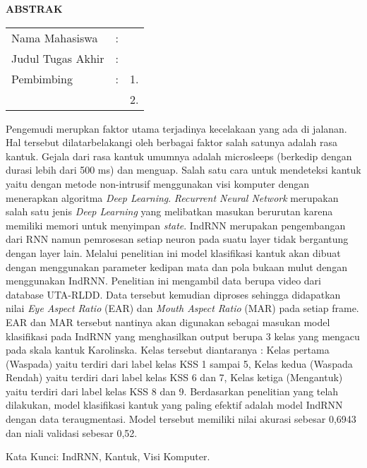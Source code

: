 \begin{center}
  \large\textbf{ABSTRAK}
\end{center}


\vspace{2ex}

\begingroup
\setlength{\tabcolsep}{0pt}

\noindent
\begin{tabularx}{\textwidth}{l >{\centering}m{2em} X}
  Nama Mahasiswa    & : & \name{}         \\

  Judul Tugas Akhir & : & \tatitle{}      \\

  Pembimbing        & : & 1. \advisor{}   \\
                    &   & 2. \coadvisor{} \\
\end{tabularx}
\endgroup

Pengemudi merupkan faktor utama terjadinya kecelakaan yang ada di jalanan. Hal tersebut
dilatarbelakangi oleh berbagai faktor salah satunya adalah rasa kantuk.  Gejala dari
rasa kantuk umumnya adalah microsleeps (berkedip dengan durasi lebih dari 500 ms) dan
menguap. Salah satu cara untuk mendeteksi kantuk yaitu dengan metode non-intrusif
menggunakan visi komputer dengan menerapkan algoritma \emph{Deep Learning}. \emph{Recurrent Neural Network} merupakan
salah satu jenis \emph{Deep Learning} yang melibatkan masukan berurutan karena memiliki memori
untuk menyimpan \emph{state}. IndRNN merupakan pengembangan dari RNN namun pemrosesan setiap
neuron pada suatu layer tidak bergantung dengan layer lain. Melalui penelitian ini
model klasifikasi kantuk akan dibuat dengan menggunakan parameter kedipan mata dan
pola bukaan mulut dengan menggunakan IndRNN. Penelitian ini mengambil data berupa
video dari database UTA-RLDD. Data tersebut kemudian diproses sehingga
didapatkan nilai \emph{Eye Aspect Ratio} (EAR) dan \emph{Mouth Aspect Ratio} (MAR) pada
setiap frame. EAR dan MAR tersebut nantinya akan digunakan sebagai masukan model
klasifikasi pada IndRNN yang menghasilkan output berupa 3 kelas yang mengacu pada skala
kantuk Karolinska. Kelas tersebut diantaranya : Kelas pertama (Waspada) yaitu
terdiri dari label kelas KSS 1 sampai 5, Kelas kedua (Waspada Rendah) yaitu terdiri dari
label kelas KSS 6 dan 7, Kelas ketiga (Mengantuk) yaitu terdiri dari label kelas
KSS 8 dan 9. Berdasarkan penelitian yang telah dilakukan, model klasifikasi kantuk yang 
paling efektif adalah model IndRNN dengan data teraugmentasi. Model tersebut memiliki 
nilai akurasi sebesar 0,6943 dan niali validasi sebesar 0,52.

Kata Kunci: IndRNN, Kantuk, Visi Komputer.
